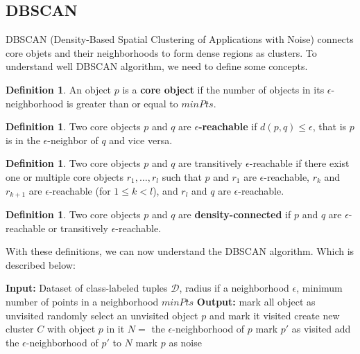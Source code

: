 \documentclass[12pt, openany]{report}
\theoremstyle{definition}
\newtheorem{definition}[thm]{Definition}
\begin{document}
\subsection{DBSCAN}
DBSCAN (Density-Based Spatial Clustering of Applications with Noise) connects core objets and their neighborhoods to form dense regions as clusters. To understand well DBSCAN algorithm, we need to define some concepts. 
\begin{definition}
    An object $p$ is a \textbf{core object} if the number of objects in its $\epsilon$-neighborhood is greater than or equal to $minPts$. 
\end{definition}
\begin{definition}
    Two core objects $p$ and $q$ are \textbf{$\epsilon$-reachable} if $d(p, q) \leq \epsilon$, that is $p$ is in the $\epsilon$-neighbor of $q$ and vice versa.
\end{definition}
\begin{definition}
    Two core objects $p$ and $q$ are transitively $\epsilon$-reachable if there exist one or multiple core objects $r_1, \ldots, r_l$ such that $p$ and $r_1$ are $\epsilon$-reachable, $r_k$ and $r_{k+1}$ are $\epsilon$-reachable (for $1 \leq k < l$), and $r_l$ and $q$ are $\epsilon$-reachable.
\end{definition}
\begin{definition}
    Two core objects $p$ and $q$ are \textbf{density-connected} if $p$ and $q$ are $\epsilon$-reachable or transitively $\epsilon$-reachable.
\end{definition}
With these definitions, we can now understand the DBSCAN algorithm. Which is described below:
\begin{algorithm}[H]
    \caption{DBSCAN}
    \begin{algorithmic}[1]
        \State \textbf{Input:} Dataset of class-labeled tuples $\mathcal{D}$, radius if a neighborhood $\epsilon$, minimum number of points in a neighborhood $minPts$
        \State \textbf{Output:}
        \State mark all object as unvisited
            \State randomly select an unvisited object $p$ and mark it visited
                \State create new cluster $C$ with object $p$ in it
                \State $N =$ the $\epsilon$-neighborhood of $p$
                        \State mark $p'$ as visited
                            \State add the $\epsilon$-neighborhood of $p'$ to $N$
                        \EndIf
                    \EndIf
                \EndFor
            \Else
                \State mark $p$ as noise
            \EndIf
        \EndWhile
    \end{algorithmic}
\end{algorithm}
\end{document}
